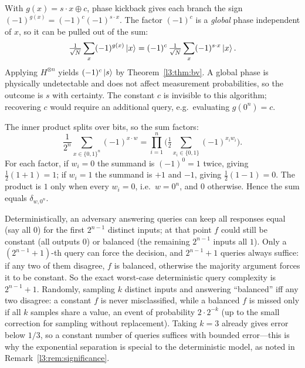 \begin{solution}
With $g(x)=s\cdot x\oplus c$, phase kickback gives each branch the sign
$(-1)^{g(x)}=(-1)^{c}(-1)^{s\cdot x}$. The factor $(-1)^c$ is a \emph{global} phase
independent of $x$, so it can be pulled out of the sum:
\[
  \tfrac{1}{\sqrt N}\sum_x(-1)^{g(x)}\ket{x}
  =(-1)^{c}\,\tfrac{1}{\sqrt N}\sum_x(-1)^{s\cdot x}\ket{x}.
\]
Applying $H^{\otimes n}$ yields $(-1)^{c}\ket{s}$ by Theorem~\ref{l3:thm:bv}. A global
phase is physically undetectable and does not affect measurement probabilities, so
the outcome is $s$ with certainty. The constant $c$ is invisible to this algorithm;
recovering $c$ would require an additional query, e.g.\ evaluating $g(0^n)=c$.
\end{solution}

\begin{solution}
The inner product splits over bits, so the sum factors:
\[
  \frac{1}{2^n}\sum_{x\in\{0,1\}^n}(-1)^{x\cdot w}
  =\prod_{i=1}^{n}\Big(\tfrac12\sum_{x_i\in\{0,1\}}(-1)^{x_i w_i}\Big).
\]
For each factor, if $w_i=0$ the summand is $(-1)^0=1$ twice, giving
$\tfrac12(1+1)=1$; if $w_i=1$ the summand is $+1$ and $-1$, giving
$\tfrac12(1-1)=0$. The product is $1$ only when every $w_i=0$, i.e.\ $w=0^n$, and
$0$ otherwise. Hence the sum equals $\delta_{w,0^n}$.
\end{solution}

\begin{solution}
Deterministically, an adversary answering queries can keep all responses equal
(say all $0$) for the first $2^{n-1}$ distinct inputs; at that point $f$ could still
be constant (all outputs $0$) or balanced (the remaining $2^{n-1}$ inputs all $1$).
Only a $(2^{n-1}+1)$-th query can force the decision, and $2^{n-1}+1$ queries always
suffice: if any two of them disagree, $f$ is balanced, otherwise the majority
argument forces it to be constant. So the exact worst-case deterministic query
complexity is $2^{n-1}+1$. Randomly, sampling $k$ distinct inputs and answering
``balanced'' iff any two disagree: a constant $f$ is never misclassified, while a
balanced $f$ is missed only if all $k$ samples share a value, an event of
probability $2\cdot 2^{-k}$ (up to the small correction for sampling without
replacement). Taking $k=3$ already gives error below $1/3$, so a constant number of
queries suffices with bounded error---this is why the exponential separation is
special to the deterministic model, as noted in Remark~\ref{l3:rem:significance}.
\end{solution}
